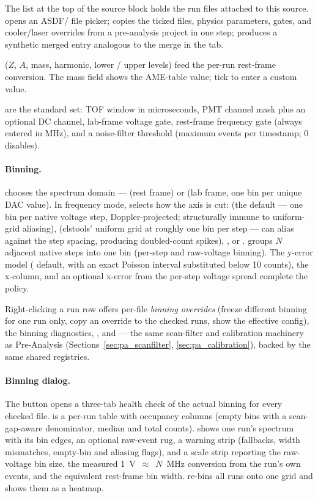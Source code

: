 The  list at the top of the source block holds the run
files attached to this source.  opens an
ASDF/ file picker;  copies
the ticked files, physics parameters, gates, and cooler/laser
overrides from a pre-analysis project in one step;
 produces a synthetic merged entry analogous to
the merge in the  tab.

 ($Z$, $A$, mass, harmonic, lower / upper
levels) feed the per-run rest-frame conversion. The mass field shows
the AME-table value; tick  to enter a custom value.

 are the standard set: TOF window in microseconds, PMT
channel mask plus an optional DC channel, lab-frame voltage gate,
rest-frame frequency gate (always entered in MHz), and a noise-filter
threshold (maximum events per timestamp; 0 disables).

\paragraph{Binning.}
 chooses the spectrum domain ---  (rest
frame) or  (lab frame, one bin per unique DAC
value). In frequency mode,  selects how the axis
is cut:  (the default --- one bin per native
voltage step, Doppler-projected; structurally immune to
uniform-grid aliasing),  (clstools' uniform grid at
roughly one bin per step --- can alias against the step spacing,
producing doubled-count spikes), , or
.  groups $N$ adjacent
native steps into one bin (per-step and raw-voltage binning). The
y-error model ( default, with an exact
Poisson interval substituted below 10 counts), the x-column, and an
optional x-error from the per-step voltage spread complete the
policy.

Right-clicking a run row offers per-file \emph{binning overrides}
(freeze different binning for one run only, copy an override to the
checked runs, show the effective config), the binning diagnostics,
, and  --- the same
scan-filter and calibration machinery as Pre-Analysis
(Sections~\ref{sec:pa_scanfilter}, \ref{sec:pa_calibration}), backed
by the same shared registries.

\paragraph{Binning dialog.}
The  button opens a three-tab health check of the actual
binning for every checked file.  is a per-run table with
occupancy columns (empty bins with a scan-gap-aware denominator,
median and total counts).  shows one run's spectrum
with its bin edges, an optional raw-event rug, a warning strip
(fallbacks, width mismatches, empty-bin and aliasing flags), and a
scale strip reporting the raw-voltage bin size, the measured
1~V~$\approx$~$N$~MHz conversion from the run's own events, and the
equivalent rest-frame bin width.  re-bins all runs onto
one grid and shows them as a heatmap.

